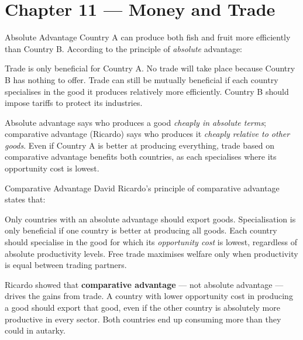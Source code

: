 \documentclass[paper=a5]{scrartcl}
\begin{document}
\section{Chapter 11 — Money and Trade}

\begin{question}[type=mc]{Absolute Advantage}
Country A can produce both fish and fruit more efficiently than Country B.
According to the principle of \emph{absolute} advantage:
\begin{choices}
  \choice        Trade is only beneficial for Country A.
  \choice        No trade will take place because Country B has nothing
                 to offer.
  \correctchoice Trade can still be mutually beneficial if each country
                 specialises in the good it produces relatively more efficiently.
  \choice        Country B should impose tariffs to protect its industries.
\end{choices}
\begin{solution}
  Absolute advantage says who produces a good \emph{cheaply in absolute terms};
  comparative advantage (Ricardo) says who produces it \emph{cheaply relative
  to other goods}. Even if Country A is better at producing everything, trade
  based on comparative advantage benefits both countries, as each specialises
  where its opportunity cost is lowest.
\end{solution}
\end{question}

\begin{question}[type=mc]{Comparative Advantage}
David Ricardo's principle of comparative advantage states that:
\begin{choices}
  \choice        Only countries with an absolute advantage should export goods.
  \choice        Specialisation is only beneficial if one country is better at
                 producing all goods.
  \correctchoice Each country should specialise in the good for which its
                 \emph{opportunity cost} is lowest, regardless of absolute
                 productivity levels.
  \choice        Free trade maximises welfare only when productivity is equal
                 between trading partners.
\end{choices}
\begin{solution}
  Ricardo showed that \textbf{comparative advantage} — not absolute advantage
  — drives the gains from trade. A country with lower opportunity cost in
  producing a good should export that good, even if the other country is
  absolutely more productive in every sector. Both countries end up consuming
  more than they could in autarky.
\end{solution}
\end{question}
\end{document}
